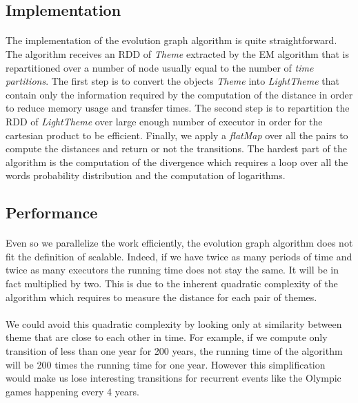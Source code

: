 \subsection{Implementation}
\label{sec:EvoGraphImplementation}
\paragraph{}
The implementation of the evolution graph algorithm is quite straightforward. The algorithm receives an RDD of \emph{Theme} extracted by the EM algorithm that is repartitioned over a number of node usually equal to the number of \emph{time partitions}. The first step is to convert the objects \emph{Theme} into \emph{LightTheme} that contain only the information required by the computation of the distance in order to reduce memory usage and transfer times. The second step is to repartition the RDD of \emph{LightTheme} over large enough number of executor in order for the cartesian product to be efficient. Finally, we apply a \emph{flatMap} over all the pairs to compute the distances and return or not the transitions. The hardest part of the algorithm is the computation of the divergence which requires a loop over all the words probability distribution and the computation of logarithms.


\subsection{Performance}
\label{sec:EvoGraphPerformance}
\paragraph{}
Even so we parallelize the work efficiently, the evolution graph algorithm does not fit the definition of scalable. Indeed, if we have twice as many periods of time and twice as many executors the running time does not stay the same. It will be in fact multiplied by two. This is due to the inherent quadratic complexity of the algorithm which requires to measure the distance for each pair of themes.

\paragraph{}
We could avoid this quadratic complexity by looking only at similarity between theme that are close to each other in time. For example, if we compute only transition of less than one year for 200 years, the running time of the algorithm will be 200 times the running time for one year. However this simplification would make us lose interesting transitions for recurrent events like the Olympic games happening every 4 years. 

